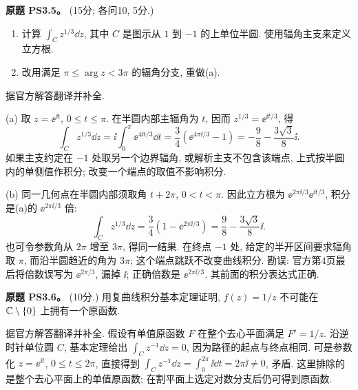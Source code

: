 \begin{exercise}\label{ass:ps3-5}
\textbf{原题 PS3.5。} (15分; 各问10, 5分.)
\begin{enumerate}[label=(\alph*)]
\item 计算 $\int_Cz^{1/3}\dd z$, 其中 $C$ 是图示从 $1$ 到 $-1$ 的上单位半圆. 使用辐角主支来定义立方根.
\item 改用满足 $\pi\le\arg z<3\pi$ 的辐角分支, 重做(a).
\end{enumerate}
\begin{center}
\end{center}
\end{exercise}
\begin{solution}
据官方解答翻译并补全.

(a) 取 $z=\ee^{\ii t}$, $0\le t\le\pi$. 在半圆内部主辐角为 $t$, 因而 $z^{1/3}=\ee^{\ii t/3}$, 得
\[
 \int_Cz^{1/3}\dd z
 =\ii\int_0^\pi\ee^{4\ii t/3}\dd t
 =\frac34(\ee^{4\pi\ii/3}-1)
 =-\frac98-\frac{3\sqrt3}{8}\ii.
\]
如果主支约定在 $-1$ 处取另一个边界辐角, 或解析主支不包含该端点, 上式按半圆内的单侧值作积分; 改变一个端点的取值不影响积分.

(b) 同一几何点在半圆内部须取角 $t+2\pi$, $0<t<\pi$.
因此立方根为 $\ee^{2\pi\ii/3}\ee^{\ii t/3}$, 积分是(a)的 $\ee^{2\pi\ii/3}$ 倍:
\[
 \int_Cz^{1/3}\dd z
 =\frac34(1-\ee^{2\pi\ii/3})
 =\frac98-\frac{3\sqrt3}{8}\ii.
\]
也可令参数角从 $2\pi$ 增至 $3\pi$, 得同一结果.
在终点 $-1$ 处, 给定的半开区间要求辐角取 $\pi$, 而沿半圆趋近的角为 $3\pi$; 这个端点跳跃不改变曲线积分.
勘误: 官方第4页最后将倍数误写为 $\ee^{2\pi/3}$, 漏掉 $\ii$; 正确倍数是 $\ee^{2\pi\ii/3}$. 其前面的积分表达式正确.
\end{solution}

\begin{exercise}\label{ass:ps3-6}
\textbf{原题 PS3.6。} (10分.) 用复曲线积分基本定理证明, $f(z)=1/z$ 不可能在 $\mathbb C\setminus\{0\}$ 上拥有一个原函数.
\end{exercise}
\begin{solution}
据官方解答翻译并补全. 假设有单值原函数 $F$ 在整个去心平面满足 $F'=1/z$.
沿逆时针单位圆 $C$, 基本定理给出 $\int_Cz^{-1}\dd z=0$, 因为路径的起点与终点相同.
可是参数化 $z=\ee^{\ii t}$, $0\le t\le2\pi$, 直接得到
$\int_Cz^{-1}\dd z=\int_0^{2\pi}\ii\dd t=2\pi\ii\ne0$, 矛盾.
这里排除的是整个去心平面上的单值原函数; 在割平面上选定对数分支后仍可得到原函数.
\end{solution}

